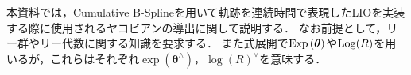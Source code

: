 
本資料では，Cumulative B-Splineを用いて軌跡を連続時間で表現したLIOを実装する際に使用されるヤコビアンの導出に関して説明する．
なお前提として，リー群やリー代数に関する知識を要求する．
また式展開で${\rm Exp} \left( \boldsymbol \theta \right)$や${\rm Log} (R)$を用いるが，これらはそれぞれ$\exp \left( \boldsymbol \theta^{\wedge} \right)$，$\log \left( R \right)^{\vee}$を意味する．
